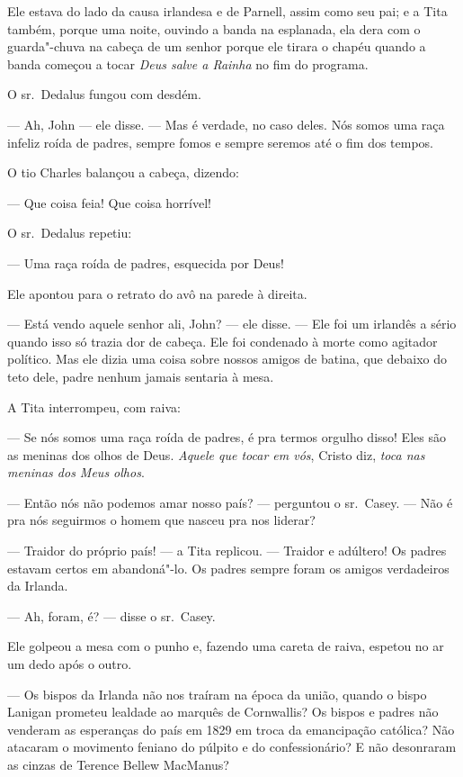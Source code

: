 Ele estava do lado da causa irlandesa e de Parnell, assim como seu pai;
e a Tita também, porque uma noite, ouvindo a banda na esplanada, ela
dera com o guarda"-chuva na cabeça de um senhor porque ele tirara o
chapéu quando a banda começou a tocar \textit{Deus salve a Rainha} no
fim do programa.

O sr.~Dedalus fungou com desdém.

 --- Ah, John --- ele disse. --- Mas é verdade, no caso deles. Nós somos uma raça infeliz roída de padres, sempre fomos e sempre seremos até o fim dos tempos.

O tio Charles balançou a cabeça, dizendo:

 --- Que coisa feia! Que coisa horrível!

O sr.~Dedalus repetiu:

 --- Uma raça roída de padres, esquecida por Deus!

Ele apontou para o retrato do avô na parede à direita.

 --- Está vendo aquele senhor ali, John? --- ele disse. --- Ele foi um irlandês a
sério quando isso só trazia dor de cabeça. Ele foi condenado à morte como
agitador político. Mas ele dizia uma coisa sobre nossos amigos de batina, que
debaixo do teto dele, padre nenhum jamais sentaria à mesa.

A Tita interrompeu, com raiva:

 --- Se nós somos uma raça roída de padres, é pra termos orgulho disso!
Eles são as meninas dos olhos de Deus. \textit{Aquele que tocar em vós},
Cristo diz, \textit{toca nas meninas dos Meus olhos}.

 --- Então nós não podemos amar nosso país? --- perguntou o sr.~Casey. --- Não é pra nós seguirmos o homem que nasceu pra nos liderar?

 --- Traidor do próprio país! --- a Tita replicou. --- Traidor e adúltero! Os
padres estavam certos em abandoná"-lo. Os padres sempre foram os amigos
verdadeiros da Irlanda.

 --- Ah, foram, é? --- disse o sr.~Casey.

Ele golpeou a mesa com o punho e, fazendo uma careta de raiva, espetou
no ar um dedo após o outro.

--- Os bispos da Irlanda não nos traíram na época da união, quando o bispo Lanigan prometeu lealdade ao marquês de Cornwallis? 
Os bispos e padres não venderam as esperanças do país em 1829 em troca da emancipação
católica? Não atacaram o movimento feniano do púlpito e do
confessionário? E não desonraram as cinzas de Terence Bellew MacManus?

